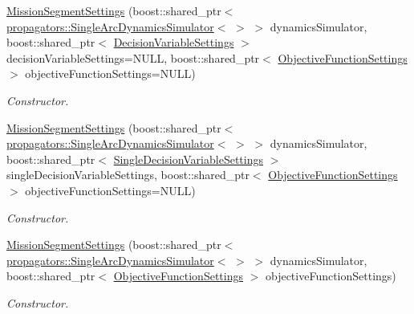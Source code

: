 \begin{DoxyCompactItemize}
\item 
\hyperlink{structtudat_1_1optimization_1_1MissionSegmentSettings_ac82df8c6df3b28595643c95edd82826a}{Mission\+Segment\+Settings} (boost\+::shared\+\_\+ptr$<$ \hyperlink{classtudat_1_1propagators_1_1SingleArcDynamicsSimulator}{propagators\+::\+Single\+Arc\+Dynamics\+Simulator}$<$  $>$ $>$ dynamics\+Simulator, boost\+::shared\+\_\+ptr$<$ \hyperlink{structtudat_1_1optimization_1_1DecisionVariableSettings}{Decision\+Variable\+Settings} $>$ decision\+Variable\+Settings=N\+U\+LL, boost\+::shared\+\_\+ptr$<$ \hyperlink{structtudat_1_1optimization_1_1ObjectiveFunctionSettings}{Objective\+Function\+Settings} $>$ objective\+Function\+Settings=N\+U\+LL)
\begin{DoxyCompactList}\small\item\em Constructor. \end{DoxyCompactList}\item 
\hyperlink{structtudat_1_1optimization_1_1MissionSegmentSettings_a623bedefe73209d53fdc2fcdf3d4a922}{Mission\+Segment\+Settings} (boost\+::shared\+\_\+ptr$<$ \hyperlink{classtudat_1_1propagators_1_1SingleArcDynamicsSimulator}{propagators\+::\+Single\+Arc\+Dynamics\+Simulator}$<$  $>$ $>$ dynamics\+Simulator, boost\+::shared\+\_\+ptr$<$ \hyperlink{structtudat_1_1optimization_1_1SingleDecisionVariableSettings}{Single\+Decision\+Variable\+Settings} $>$ single\+Decision\+Variable\+Settings, boost\+::shared\+\_\+ptr$<$ \hyperlink{structtudat_1_1optimization_1_1ObjectiveFunctionSettings}{Objective\+Function\+Settings} $>$ objective\+Function\+Settings=N\+U\+LL)
\begin{DoxyCompactList}\small\item\em Constructor. \end{DoxyCompactList}\item 
\hyperlink{structtudat_1_1optimization_1_1MissionSegmentSettings_a621262e2c45a699eb4532b3ed60faf67}{Mission\+Segment\+Settings} (boost\+::shared\+\_\+ptr$<$ \hyperlink{classtudat_1_1propagators_1_1SingleArcDynamicsSimulator}{propagators\+::\+Single\+Arc\+Dynamics\+Simulator}$<$  $>$ $>$ dynamics\+Simulator, boost\+::shared\+\_\+ptr$<$ \hyperlink{structtudat_1_1optimization_1_1ObjectiveFunctionSettings}{Objective\+Function\+Settings} $>$ objective\+Function\+Settings)
\begin{DoxyCompactList}\small\item\em Constructor. \end{DoxyCompactList}\item 

\end{DoxyCompactItemize}

